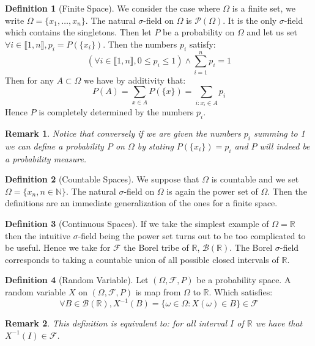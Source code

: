 \documentclass[10pt,a4paper]{book}
\newtheorem*{remark}{Remark}
\theoremstyle{definition}
\newtheorem{definition}{Definition}[section]
\begin{document}
\begin{definition}[Finite Space]
We consider the case where $\Omega$ is a finite set, we write $\Omega = \{x_1, \ldots, x_n\}$. The natural $\sigma$-field on $\Omega$ is $\mathcal{P}(\Omega)$. It is the only $\sigma$-field which contains the singletons. Then let $P$ be a probability on $\Omega$ and let us set $\forall i \in \llbracket 1, n\rrbracket, p_i = P(\{x_i\})$. Then the numbers $p_i$ satisfy:
\[
\left( \forall i \in \llbracket 1, n\rrbracket, 0 \leq p_i \leq 1\right) \land \sum_{i = 1}^n p_i = 1
\]
Then for any $A \subset \Omega$ we have by additivity that:
\[
P(A) = \sum_{x \in A} P(\{x\}) = \sum_{i : x_i \in A} p_i
\]
Hence $P$ is completely determined by the numbers $p_i$.
\end{definition}

\begin{remark}
Notice that conversely if we are given the numbers $p_i$ summing to 1 we can define a probability $P$ on $\Omega$ by stating $P(\{x_i\}) = p_i$ and $P$ will indeed be a probability measure.
\end{remark}

\begin{definition}[Countable Spaces]
We suppose that $\Omega$ is countable and we set $\Omega = \{ x_n , n \in \mathbb{N}\}$. The natural $\sigma$-field on $\Omega$ is again the power set of $\Omega$. Then the definitions are an immediate generalization of the ones for a finite space.
\end{definition}

\begin{definition}[Continuous Spaces]
If we take the simplest example of $\Omega = \mathbb{R}$ then the intuitive $\sigma$-field being the power set turns out to be too complicated to be useful. Hence we take for $\mathcal{F}$ the Borel tribe of $\mathbb{R}$, $\mathcal{B}(\mathbb{R})$. The Borel $\sigma$-field corresponds to taking a countable union of all possible closed intervals of $\mathbb{R}$.
\end{definition}

\begin{definition}[Random Variable]
Let $(\Omega, \mathcal{F}, P)$ be a probability space. A random variable $X$ on $(\Omega, \mathcal{F}, P)$ is map from $\Omega$ to $\mathbb{R}$. Which satisfies:
\[
\forall B \in \mathcal{B}(\mathbb{R}), X^{-1}(B) = \{ \omega \in \Omega : X(\omega) \in B \} \in \mathcal{F}
\]
\end{definition}

\begin{remark}
This definition is equivalent to: for all interval $I$ of $\mathbb{R}$ we have that $X^{-1}(I) \in \mathcal{F}$.
\end{remark}
\end{document}
